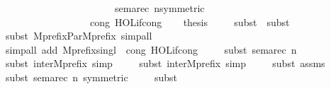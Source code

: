\begin{isabellebody}
\ \ \ \ \ \ \ \ \ \ \ \ \ \ \ \ \ \ \ \ \ \ sema{\isacharunderscore}{\kern0pt}rec{\isacharbrackleft}{\kern0pt}\ n{\isacharequal}{\kern0pt}{\isacartoucheopen}{}{\isacartoucheclose}{\isacharcomma}{\kern0pt}symmetric{\isacharbrackright}{\kern0pt}\ \isanewline
\ \ \ \ \ \ \ \ \ \ \ \ \ \ \ \ \ cong{\isacharcolon}{\kern0pt}\ HOL{\isachardot}{\kern0pt}if{\isacharunderscore}{\kern0pt}cong{\isacharparenright}{\kern0pt}\isanewline
\ \ \isamarkupfalse%
\ {\isacharquery}{\kern0pt}thesis\isanewline
\ \ \ \ \isamarkupfalse%
{\isacharparenleft}{\kern0pt}subst\ {}{\isacharcomma}{\kern0pt}\ subst\ {}{\isacharparenright}{\kern0pt}\isanewline
\ \ \ \ \isamarkupfalse%
{\isacharparenleft}{\kern0pt}subst\ Mprefix{\isacharunderscore}{\kern0pt}Par{\isacharunderscore}{\kern0pt}Mprefix{\isacharcomma}{\kern0pt}\ simp{\isacharunderscore}{\kern0pt}all{\isacharparenright}{\kern0pt}\isanewline
\ \ \ \ \isamarkupfalse%
{\isacharparenleft}{\kern0pt}simp{\isacharunderscore}{\kern0pt}all\ add{\isacharcolon}{\kern0pt}\ Mprefix{\isacharunderscore}{\kern0pt}singl\ \ cong{\isacharcolon}{\kern0pt}\ HOL{\isachardot}{\kern0pt}if{\isacharunderscore}{\kern0pt}cong{\isacharparenright}{\kern0pt}\isanewline
\ \ \ \ \isamarkupfalse%
{\isacharparenleft}{\kern0pt}subst\ sema{\isacharunderscore}{\kern0pt}rec{\isacharbrackleft}{\kern0pt}\ n{\isacharequal}{\kern0pt}{\isacartoucheopen}{}{\isacartoucheclose}{\isacharbrackright}{\kern0pt}{\isacharparenright}{\kern0pt}\isanewline
\ \ \ \ \isamarkupfalse%
{\isacharparenleft}{\kern0pt}subst\ inter{}Mprefix{}{\isacharcomma}{\kern0pt}\ simp{\isacharparenright}{\kern0pt}\isanewline
\ \ \ \ \isamarkupfalse%
{\isacharparenleft}{\kern0pt}subst\ inter{}Mprefix{}{\isacharcomma}{\kern0pt}\ simp{\isacharparenright}{\kern0pt}\isanewline
\ \ \ \ \isamarkupfalse%
{\isacharparenleft}{\kern0pt}subst\ assms{\isacharparenright}{\kern0pt}\isanewline
\ \ \ \ \isamarkupfalse%
{\isacharparenleft}{\kern0pt}subst\ sema{\isacharunderscore}{\kern0pt}rec{\isacharbrackleft}{\kern0pt}\ n{\isacharequal}{\kern0pt}{\isacartoucheopen}{}{\isacartoucheclose}{\isacharcomma}{\kern0pt}\ symmetric{\isacharbrackright}{\kern0pt}{\isacharparenright}{\kern0pt}\isanewline
\ \ \ \ \isamarkupfalse%
{\isacharparenleft}{\kern0pt}subst\ {}{\isacharparenright}{\kern0pt}\isanewline

\end{isabellebody}
